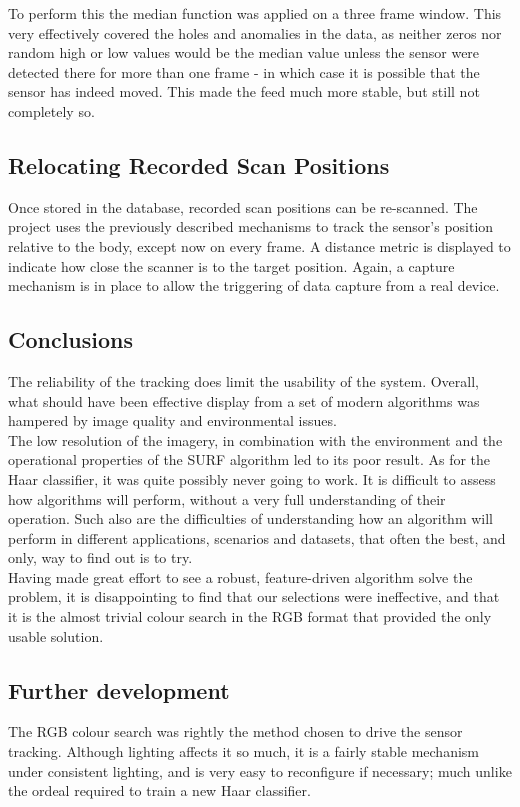 To perform this the median function was applied on a three frame window. This very effectively covered the holes and anomalies in the data, as neither zeros nor random high or low values would be the median value unless the sensor were detected there for more than one frame - in which case it is possible that the sensor has indeed moved. This made the feed much more stable, but still not completely so.\\

\subsection{Relocating Recorded Scan Positions}
Once stored in the database, recorded scan positions can be re-scanned. The project uses the previously described mechanisms to track the sensor's position relative to the body, except now on every frame. A distance metric is displayed to indicate how close the scanner is to the target position. Again, a capture mechanism is in place to allow the triggering of data capture from a real device.\\

\subsection{Conclusions}
The reliability of the tracking does limit the usability of the system. Overall, what should have been effective display from a set of modern algorithms was hampered by image quality and environmental issues.\\

The low resolution of the imagery, in combination with the environment and the operational properties of the SURF algorithm led to its poor result. As for the Haar classifier, it was quite possibly never going to work. It is difficult to assess how algorithms will perform, without a very full understanding of their operation. Such also are the difficulties of understanding how an algorithm will perform in different applications, scenarios and datasets, that often the best, and only, way to find out is to try.\\

Having made great effort to see a robust, feature-driven algorithm solve the problem, it is disappointing to find that our selections were ineffective, and that it is the almost trivial colour search in the RGB format that provided the only usable solution.\\

\subsection{Further development}
The RGB colour search was rightly the method chosen to drive the sensor tracking. Although lighting affects it so much, it is a fairly stable mechanism under consistent lighting, and is very easy to reconfigure if necessary; much unlike the ordeal required to train a new Haar classifier.\\

